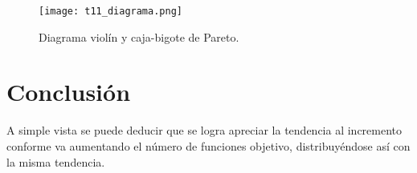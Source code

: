 \documentclass[12pt]{amsart}
\begin{document}
\begin{figure}[h!]
    \centering
    \texttt{[image: t11\_diagrama.png]}
    \caption{Diagrama violín y caja-bigote de Pareto.}
    \label{fig1}
\end{figure}


\section{Conclusión}
A simple vista se puede deducir que se logra apreciar la tendencia al incremento conforme va aumentando el número de funciones objetivo, distribuyéndose así con la misma tendencia.



\end{document}

